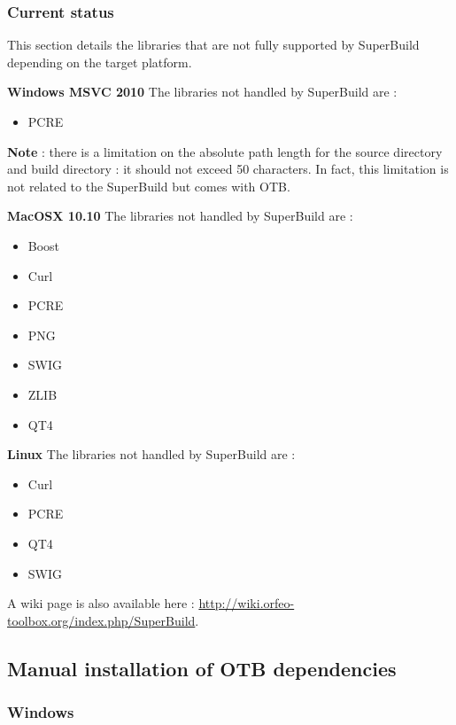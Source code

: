 \subsubsection{Current status}

This section details the libraries that are not fully supported by SuperBuild depending on the target platform. 

\textbf{Windows MSVC 2010}
\newline
The libraries not handled by SuperBuild are : 
\begin{itemize}
	\item PCRE
\end{itemize}

\textbf{Note} : there is a limitation on the absolute path length for the source directory and build directory : it should not exceed 50 characters. In fact, this limitation is not related to the SuperBuild but comes with OTB.

\textbf{MacOSX 10.10}
\newline
The libraries not handled by SuperBuild are : 
\begin{itemize}
	\item Boost
	\item Curl
	\item PCRE
	\item PNG
	\item SWIG
	\item ZLIB
	\item QT4
\end{itemize}

\textbf{Linux}
\newline
The libraries not handled by SuperBuild are : 
\begin{itemize}
	\item Curl
	\item PCRE
	\item QT4
	\item SWIG
\end{itemize}

A wiki page is also available here : \url{http://wiki.orfeo-toolbox.org/index.php/SuperBuild}.

\subsection{Manual installation of OTB dependencies}
\label{sec:manualdependencies}

\subsubsection{Windows}

